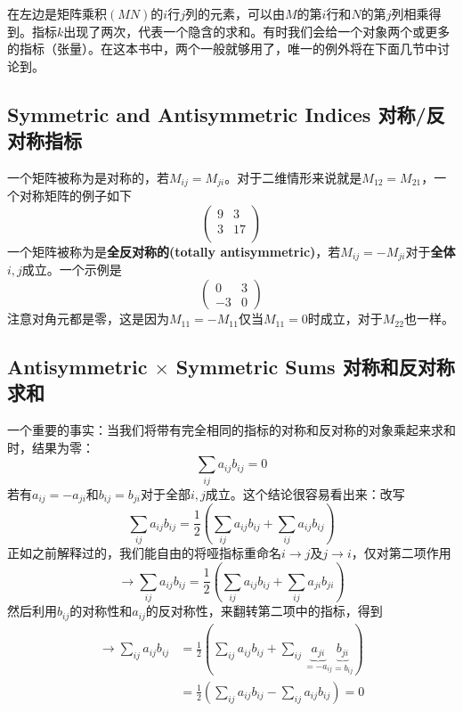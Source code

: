 在左边是矩阵乘积$(MN)$的$i$行$j$列的元素，可以由$M$的第$i$行和$N$的第$j$列相乘得到。指标$k$出现了两次，代表一个隐含的求和。有时我们会给一个对象两个或更多的指标（张量）。在这本书中，两个一般就够用了，唯一的例外将在下面几节中讨论到。

\subsection[对称/反对称指标]{Symmetric and Antisymmetric Indices 对称/反对称指标}\label{appendix.B.5.3}
一个矩阵被称为是对称的，若$M_{ij}=M_{ji}$。对于二维情形来说就是$M_{12}=M_{21}$，一个对称矩阵的例子如下
\begin{equation}
\begin{pmatrix}
9 & 3 \\ 3 & 17 \\
\end{pmatrix}
\end{equation}
一个矩阵被称为是{\bf 全反对称的(totally antisymmetric)}，若$M_{ij}=-M_{ji}$对于{\bf 全体}$i,j$成立。一个示例是
\begin{equation}
\begin{pmatrix}
0 & 3 \\ -3 & 0
\end{pmatrix}
\end{equation}
注意对角元都是零，这是因为$M_{11}=-M_{11}$仅当$M_{11}=0$时成立，对于$M_{22}$也一样。
\subsection[对称和反对称求和]{Antisymmetric $\times$ Symmetric Sums 对称和反对称求和}\label{appendix.B.5.4}
一个重要的事实：当我们将带有完全相同的指标的对称和反对称的对象乘起来求和时，结果为零：
\begin{equation}
\sum\limits_{ij}a_{ij}b_{ij} = 0
\end{equation}
若有$a_{ij}=-a_{ji}$和$b_{ij}=b_{ji}$对于全部$i,j$成立。这个结论很容易看出来：改写
\begin{equation}
\sum\limits_{ij}a_{ij}b_{ij} = \frac{1}{2}\left(\sum\limits_{ij}a_{ij}b_{ij}+\sum\limits_{ij}a_{ij}b_{ij}\right)
\end{equation}
正如之前解释过的，我们能自由的将哑指标重命名$i\rightarrow j$及$j\rightarrow i$，仅对第二项作用
\begin{equation}
\rightarrow \sum\limits_{ij}a_{ij}b_{ij} = \frac{1}{2}\left(\sum\limits_{ij}a_{ij}b_{ij}+\sum\limits_{ij}a_{ji}b_{ji}\right)
\end{equation}
然后利用$b_{ij}$的对称性和$a_{ij}$的反对称性，来翻转第二项中的指标，得到%
\begin{equation}
\begin{aligned}
\rightarrow \sum\limits_{ij}a_{ij}b_{ij} &= \frac{1}{2}\left(\sum\limits_{ij}a_{ij}b_{ij}+\sum\limits_{ij}\underbrace{a_{ji}}_{=-a_{ij}}\underbrace{b_{ji}}_{=b_{ij}}\right)\\
 &= \frac{1}{2}\left(\sum\limits_{ij}a_{ij}b_{ij}-\sum\limits_{ij}a_{ij}b_{ij}\right) = 0
\end{aligned}
\end{equation}
